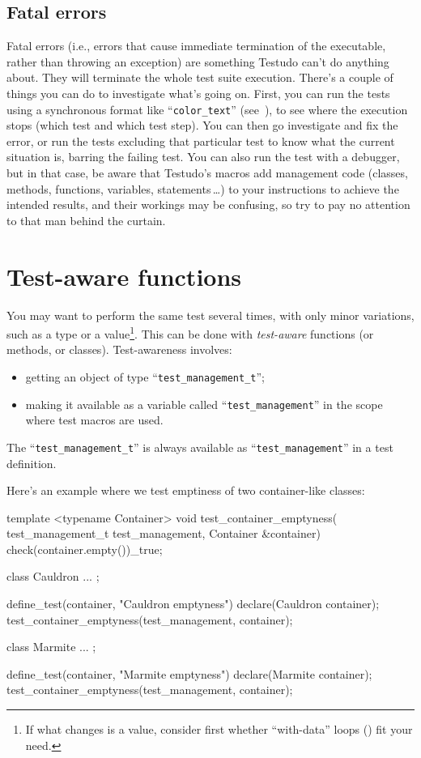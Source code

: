 \documentclass[twoside, a4paper, article]{memoir}
\newcommand*\ellipsis{\,\ldots}
\begin{document}
\section{Fatal errors}
\label{sec:fatal-errors}

Fatal errors (i.e., errors that cause immediate termination of the executable,
rather than throwing an exception) are something Testudo can't do anything
about.  They will terminate the whole test suite execution.  There's a couple
of things you can do to investigate what's going on.  First, you can run the
tests using a synchronous format like ``\texttt{color\_text}''
(see~), to see where the execution stops (which
test and which test step).  You can then go investigate and fix the error, or
run the tests excluding that particular test to know what the current situation
is, barring the failing test.  You can also run the test with a debugger, but
in that case, be aware that Testudo's macros add management code (classes,
methods, functions, variables, statements\ellipsis{}) to your instructions to
achieve the intended results, and their workings may be confusing, so try to
pay no attention to that man behind the curtain.


\chapter{Test-aware functions}
\label{cha:test-aware-functions}

You may want to perform the same test several times, with only minor
variations, such as a type or a value\footnote{If what changes is a value,
  consider first whether ``with-data'' loops () fit
  your need.}.  This can be done with \emph{test-aware} functions (or methods,
or classes).  Test-awareness involves:
\begin{itemize}
\item getting an object of type ``\texttt{test\_management\_t}'';
\item making it available as a variable called ``\texttt{test\_management}'' in
  the scope where test macros are used.
\end{itemize}
The ``\texttt{test\_management\_t}'' is always available as
``\texttt{test\_management}'' in a test definition.

Here's an example where we test emptiness of two container-like classes:
\begin{cpplisting}
template <typename Container>
void test_container_emptyness(
    test_management_t test_management,
    Container &container) {
  check(container.empty())_true;
}

class Cauldron { ... };

define_test(container, "Cauldron emptyness") {
  declare(Cauldron container);
  test_container_emptyness(test_management, container);
}

class Marmite { ... };

define_test(container, "Marmite emptyness") {
  declare(Marmite container);
  test_container_emptyness(test_management, container);
}
\end{cpplisting}
\end{document}
